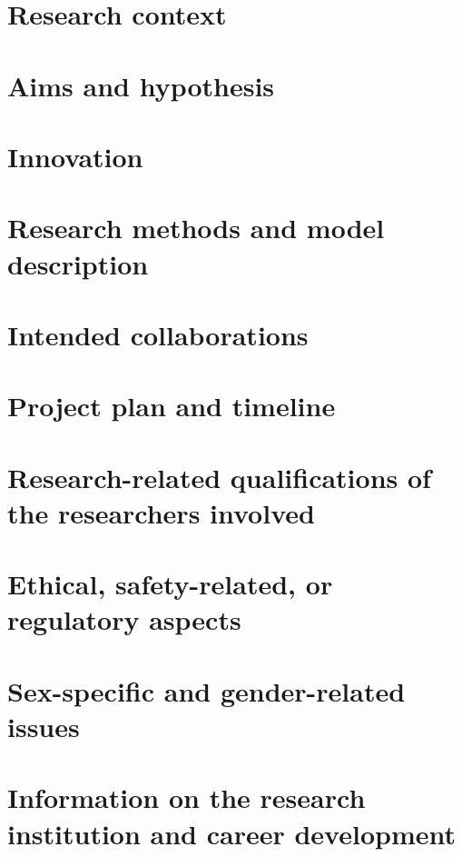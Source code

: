 \documentclass[11pt, a4paper, oneside, article]{memoir}
\begin{document}
\setlength{\baselineskip}{15pt}         %



\frontmatter
\tableofcontents*

\mainmatter
\chapter{Research context}
\label{c:context}


\chapter{Aims and hypothesis}
\label{c:aim_hyp}


\chapter{Innovation}
\label{c:innovation}


\chapter{Research methods and model description}


\chapter{Intended collaborations}


\chapter{Project plan and timeline}


\chapter{Research-related qualifications of the researchers involved}


\chapter{Ethical, safety-related, or regulatory aspects}


\chapter{Sex-specific and gender-related issues}


\chapter{Information on the research institution and career development}
\label{c:info_dev}


\vfill


\appendix
\printglossaries

\newpage
\printbibliography[env=bibliography]
\end{document}
